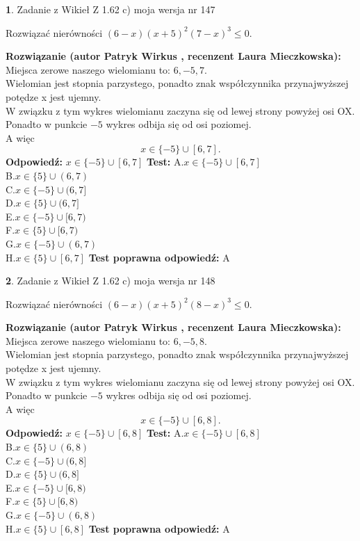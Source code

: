 \documentclass[12pt, a4paper]{article}
\theoremstyle{definition} %
\newtheorem{zad}{}
\newcommand{\zadStart}[1]{\begin{zad}#1\newline}
\newcommand{\zadStop}{\end{zad}}
\newcommand{\rozwStart}[2]{\noindent \textbf{Rozwiązanie (autor #1 , recenzent #2): }\newline}
\newcommand{\rozwStop}{\newline}
\newcommand{\odpStart}{\noindent \textbf{Odpowiedź:}\newline}
\newcommand{\odpStop}{\newline}
\newcommand{\testStart}{\noindent \textbf{Test:}\newline}
\newcommand{\testStop}{\newline}
\newcommand{\kluczStart}{\noindent \textbf{Test poprawna odpowiedź:}\newline}
\newcommand{\kluczStop}{\newline}
\begin{document}
\zadStart{Zadanie z Wikieł Z 1.62 c) moja wersja nr 147}

Rozwiązać nierówności $(6-x)(x+5)^{2}(7-x)^{3}\le0$.
\zadStop
\rozwStart{Patryk Wirkus}{Laura Mieczkowska}
Miejsca zerowe naszego wielomianu to: $6, -5, 7$.\\
Wielomian jest stopnia parzystego, ponadto znak współczynnika przy\linebreak najwyższej potędze x jest ujemny.\\ W związku z tym wykres wielomianu zaczyna się od lewej strony powyżej osi OX.\\
Ponadto w punkcie $-5$ wykres odbija się od osi poziomej.\\
A więc $$x \in \{-5\} \cup [6,7].$$
\rozwStop
\odpStart
$x \in \{-5\} \cup [6,7]$
\odpStop
\testStart
A.$x \in \{-5\} \cup [6,7]$\\
B.$x \in \{5\} \cup (6,7)$\\
C.$x \in \{-5\} \cup (6,7]$\\
D.$x \in \{5\} \cup (6,7]$\\
E.$x \in \{-5\} \cup [6,7)$\\
F.$x \in \{5\} \cup [6,7)$\\
G.$x \in \{-5\} \cup (6,7)$\\
H.$x \in \{5\} \cup [6,7]$
\testStop
\kluczStart
A
\kluczStop



\zadStart{Zadanie z Wikieł Z 1.62 c) moja wersja nr 148}

Rozwiązać nierówności $(6-x)(x+5)^{2}(8-x)^{3}\le0$.
\zadStop
\rozwStart{Patryk Wirkus}{Laura Mieczkowska}
Miejsca zerowe naszego wielomianu to: $6, -5, 8$.\\
Wielomian jest stopnia parzystego, ponadto znak współczynnika przy\linebreak najwyższej potędze x jest ujemny.\\ W związku z tym wykres wielomianu zaczyna się od lewej strony powyżej osi OX.\\
Ponadto w punkcie $-5$ wykres odbija się od osi poziomej.\\
A więc $$x \in \{-5\} \cup [6,8].$$
\rozwStop
\odpStart
$x \in \{-5\} \cup [6,8]$
\odpStop
\testStart
A.$x \in \{-5\} \cup [6,8]$\\
B.$x \in \{5\} \cup (6,8)$\\
C.$x \in \{-5\} \cup (6,8]$\\
D.$x \in \{5\} \cup (6,8]$\\
E.$x \in \{-5\} \cup [6,8)$\\
F.$x \in \{5\} \cup [6,8)$\\
G.$x \in \{-5\} \cup (6,8)$\\
H.$x \in \{5\} \cup [6,8]$
\testStop
\kluczStart
A
\kluczStop
\end{document}
